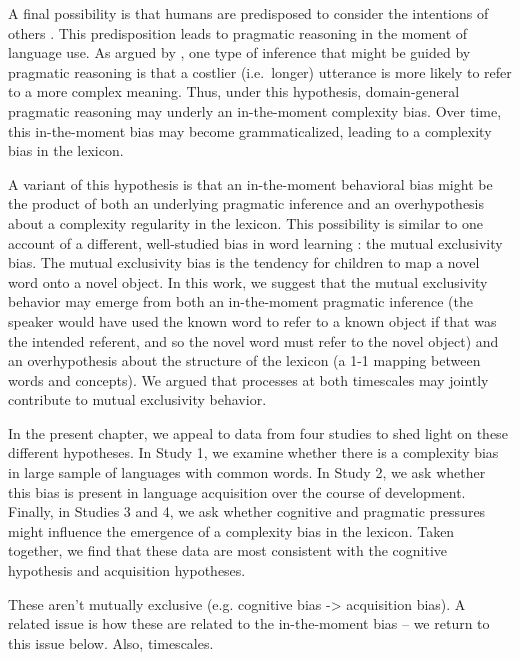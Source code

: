 \hspace*{.3 cm}{ \it 3.\ The Communicative Pressure Hypothesis. } A final possibility is that humans are predisposed to consider the intentions of others \cite{tomasello2005understanding}. This predisposition leads to pragmatic reasoning in the moment of language use. As argued by , one type of inference that might be guided by pragmatic reasoning is that a costlier (i.e.\ longer) utterance is more likely to refer to a more complex meaning. Thus, under this hypothesis, domain-general pragmatic reasoning may underly an in-the-moment complexity bias. Over time, this in-the-moment bias may become grammaticalized, leading to a complexity bias in the lexicon.

A variant of this hypothesis is that an in-the-moment behavioral bias might be the product of both an underlying pragmatic inference and an overhypothesis about a complexity regularity in the lexicon. This possibility is similar to one account of a different, well-studied bias in word learning \cite{lewis2013b}: the mutual exclusivity bias. The mutual exclusivity bias is the tendency for children to map a novel word onto a novel object. In this work, we suggest that the mutual exclusivity behavior may emerge from both an in-the-moment pragmatic inference (the speaker would have used the known word to refer to a known object if that was the intended referent,  and so the novel word must refer to the novel object) and an overhypothesis about the structure of the lexicon (a 1-1 mapping between words and concepts).  We argued that processes at both timescales may jointly contribute to mutual exclusivity behavior. 

In the present chapter, we appeal to data from four studies to shed light on these different hypotheses. In Study 1, we examine whether there is a complexity bias in large sample of languages with common words. In Study 2, we ask whether this bias is present in language acquisition over the course of development. Finally, in Studies 3 and 4, we ask whether cognitive and pragmatic pressures might influence the emergence of a complexity bias in the lexicon. Taken together, we find that these data are most consistent with the cognitive hypothesis and acquisition hypotheses. 

These aren't mutually exclusive (e.g. cognitive bias -> acquisition bias). A related issue is how these are related to the in-the-moment bias -- we return to this issue below. Also, timescales.



